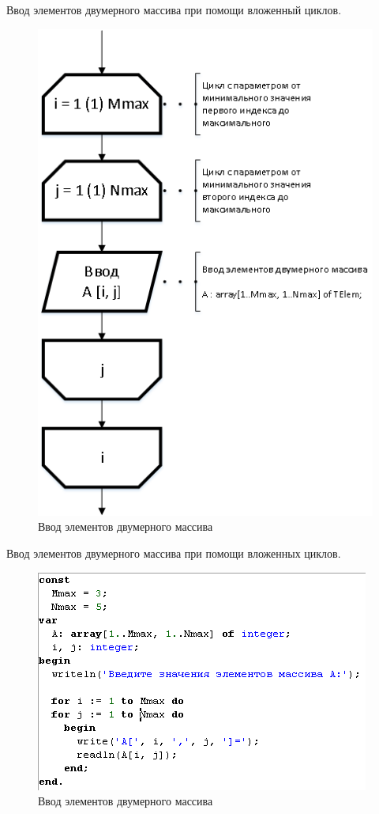\documentclass{beamer}
\begin{document}
\begin{frame}
Ввод элементов двумерного массива при помощи вложенный циклов.
\begin{figure}[h]
\centering
\includegraphics[scale=0.45]{images/array_input_two.png}
\caption{Ввод элементов двумерного массива}
\label{pic-input-two-index}
\end{figure}
\end{frame}

\begin{frame}
Ввод элементов двумерного массива при помощи вложенных циклов.
\begin{figure}[h]
\centering
\includegraphics[scale=1.0]{images/array_input_code_two.png}
\caption{Ввод элементов двумерного массива}
\label{pic-input-two-index-code}
\end{figure}
\end{frame}
\end{document}
